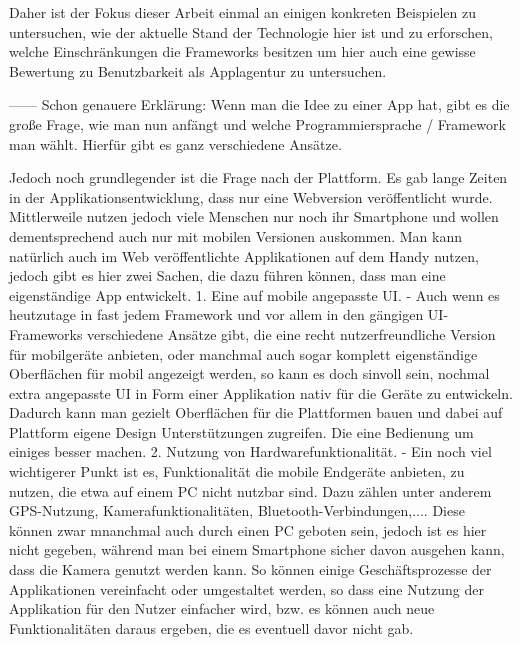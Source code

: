 Daher ist der Fokus dieser Arbeit einmal an einigen konkreten Beispielen zu untersuchen, wie der aktuelle Stand der Technologie hier ist und zu erforschen, welche Einschränkungen die Frameworks besitzen um hier auch eine gewisse Bewertung zu Benutzbarkeit als Applagentur zu untersuchen.

------
Schon genauere Erklärung:
Wenn man die Idee zu einer App hat, gibt es die große Frage, wie man nun anfängt und welche Programmiersprache / Framework man wählt. Hierfür gibt es ganz verschiedene Ansätze.  

Jedoch noch grundlegender ist die Frage nach der Plattform. Es gab lange Zeiten in der Applikationsentwicklung, dass nur eine Webversion veröffentlicht wurde. Mittlerweile nutzen jedoch viele Menschen nur noch ihr Smartphone und wollen dementsprechend auch nur mit mobilen Versionen auskommen. Man kann natürlich auch im Web veröffentlichte Applikationen auf dem Handy nutzen, jedoch gibt es hier zwei Sachen, die dazu führen können, dass man eine eigenständige App entwickelt.
1. Eine auf mobile angepasste UI. - Auch wenn es heutzutage in fast jedem Framework und vor allem in den gängigen UI-Frameworks verschiedene Ansätze gibt, die eine recht nutzerfreundliche Version für mobilgeräte anbieten, oder manchmal auch sogar komplett eigenständige Oberflächen für mobil angezeigt werden, so kann es doch sinvoll sein, nochmal extra angepasste UI in Form einer Applikation nativ für die Geräte zu entwickeln. Dadurch kann man gezielt Oberflächen für die Plattformen bauen und dabei auf Plattform eigene Design Unterstützungen zugreifen. Die eine Bedienung um einiges besser machen.
2. Nutzung von Hardwarefunktionalität. -  Ein noch viel wichtigerer Punkt ist es, Funktionalität die mobile Endgeräte anbieten, zu nutzen, die etwa auf einem PC nicht nutzbar sind. Dazu zählen unter anderem GPS-Nutzung, Kamerafunktionalitäten, Bluetooth-Verbindungen,.... Diese können zwar mnanchmal auch durch einen PC geboten sein, jedoch ist es hier nicht gegeben, während man bei einem Smartphone sicher davon ausgehen kann, dass die Kamera genutzt werden kann. So können einige Geschäftsprozesse der Applikationen vereinfacht oder umgestaltet werden, so dass eine Nutzung der Applikation für den Nutzer einfacher wird, bzw. es können auch neue Funktionalitäten daraus ergeben, die es eventuell davor nicht gab.

